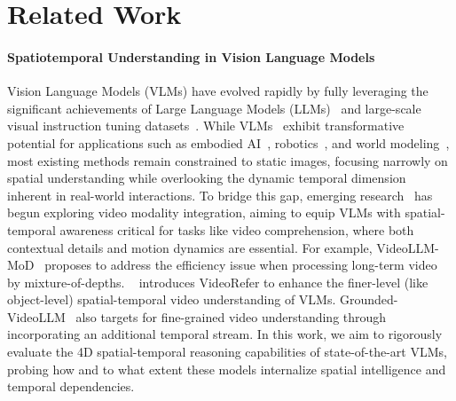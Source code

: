 

\section{Related Work}
\label{sec:related_work}

\paragraph{Spatiotemporal Understanding in Vision Language Models}%
Vision Language Models (VLMs) have evolved rapidly by fully leveraging the significant achievements of Large Language Models (LLMs)~\cite{brown2020language, devlin2019bert, wei2021finetuned, bai2023qwen, touvron2023llama, radford2018improving} and large-scale visual instruction tuning datasets~\cite{liu2023visual, zhu2023minigpt, dai2023instructblip}. While VLMs~\cite{gong2023multimodal, liu2023visual, zhu2023minigpt, abouelenin2025phi4minitechnicalreportcompact, hurst2024gpt, li2024llava, team2024gemini, wang2024qwen2} exhibit transformative potential for applications such as embodied AI~\cite{suglia2024alanavlm, driess2023palm, kim2024openvla}, robotics~\cite{wang2024vlm, patel2025real}, and world modeling~\cite{liu2024world, zhang2024combo}, most existing methods remain constrained to static images, focusing narrowly on spatial understanding while overlooking the dynamic temporal dimension inherent in real-world interactions. To bridge this gap, emerging research~\cite{li2023videochat, zhang2023video, cheng2024videollama, maaz2023video, zhang2025videollama} has begun exploring video modality integration, aiming to equip VLMs with spatial-temporal awareness critical for tasks like video comprehension, where both contextual details and motion dynamics are essential. For example, VideoLLM-MoD~\cite{wu2024videollm} proposes to address the efficiency issue when processing long-term video by mixture-of-depths. ~\cite{yuan2024videorefer} introduces VideoRefer to enhance the finer-level (like object-level) spatial-temporal video understanding of VLMs. Grounded-VideoLLM~\cite{wang2024grounded} also targets for fine-grained video understanding through incorporating an additional temporal stream. In this work, we aim to rigorously evaluate the 4D spatial-temporal reasoning capabilities of state-of-the-art VLMs, probing how and to what extent these models internalize spatial intelligence and temporal dependencies.

